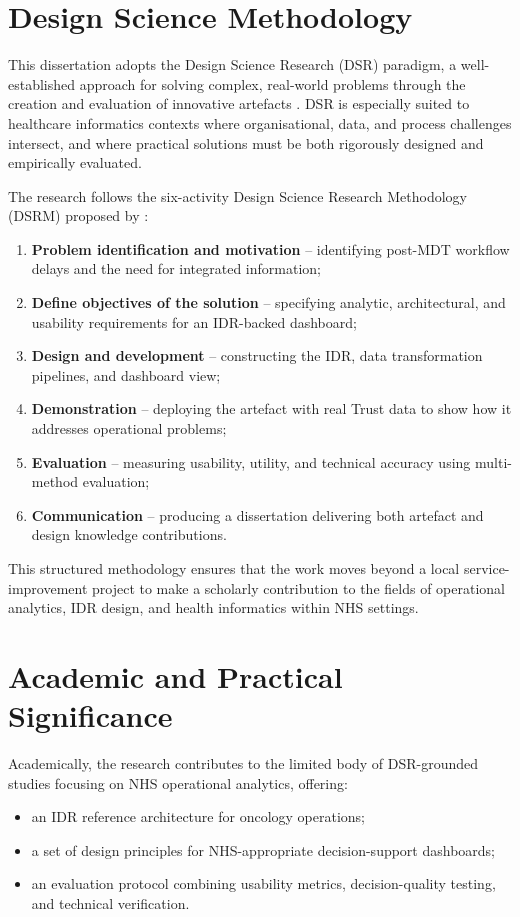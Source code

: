 \section{Design Science Methodology}

This dissertation adopts the Design Science Research (DSR) paradigm, a well-established approach for solving complex, real-world problems through the creation and evaluation of innovative artefacts \citep{hevner2004}. DSR is especially suited to healthcare informatics contexts where organisational, data, and process challenges intersect, and where practical solutions must be both rigorously designed and empirically evaluated.

The research follows the six-activity Design Science Research Methodology (DSRM) proposed by \cite{Peffers2007}:
\begin{enumerate}
    \item \textbf{Problem identification and motivation} – identifying post-MDT workflow delays and the need for integrated information;
    \item \textbf{Define objectives of the solution} – specifying analytic, architectural, and usability requirements for an IDR-backed dashboard;
    \item \textbf{Design and development} – constructing the IDR, data transformation pipelines, and dashboard view;
    \item \textbf{Demonstration} – deploying the artefact with real Trust data to show how it addresses operational problems;
    \item \textbf{Evaluation} – measuring usability, utility, and technical accuracy using multi-method evaluation;
    \item \textbf{Communication} – producing a dissertation delivering both artefact and design knowledge contributions.
\end{enumerate}

This structured methodology ensures that the work moves beyond a local service-improvement project to make a scholarly contribution to the fields of operational analytics, IDR design, and health informatics within NHS settings.

\section{Academic and Practical Significance}

Academically, the research contributes to the limited body of DSR-grounded studies focusing on NHS operational analytics, offering:
\begin{itemize}
    \item an IDR reference architecture for oncology operations;
    \item a set of design principles for NHS-appropriate decision-support dashboards;
    \item an evaluation protocol combining usability metrics, decision-quality testing, and technical verification.
\end{itemize}

